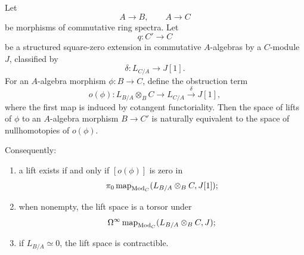 \begin{proposition}
\label{prop:formal-lifting-fixed-square-zero}
Let
\[
    A\longrightarrow B,
    \qquad
    A\longrightarrow C
\]
be morphisms of commutative ring spectra. Let
\[
    q:C'\longrightarrow C
\]
be a structured square-zero extension in commutative \(A\)-algebras by a
\(C\)-module \(J\), classified by
\[
    \delta:L_{C/A}\longrightarrow J[1].
\]
For an \(A\)-algebra morphism \(\phi:B\to C\), define the obstruction term
\[
    o(\phi):
    L_{B/A}\otimes_BC
    \longrightarrow
    L_{C/A}
    \xrightarrow{\delta}
    J[1],
\]
where the first map is induced by cotangent functoriality. Then the space of
lifts of \(\phi\) to an \(A\)-algebra morphism \(B\to C'\) is naturally
equivalent to the space of nullhomotopies of \(o(\phi)\).

Consequently:
\begin{enumerate}[label=(\roman*)]
    \item a lift exists if and only if \([o(\phi)]\) is zero in
    \[
        \pi_0\operatorname{map}_{\operatorname{Mod}_C}
        (L_{B/A}\otimes_BC,J[1]);
    \]
    \item when nonempty, the lift space is a torsor under
    \[
        \Omega^\infty
        \operatorname{map}_{\operatorname{Mod}_C}(L_{B/A}\otimes_BC,J);
    \]
    \item if \(L_{B/A}\simeq0\), the lift space is contractible.
\end{enumerate}
\end{proposition}

